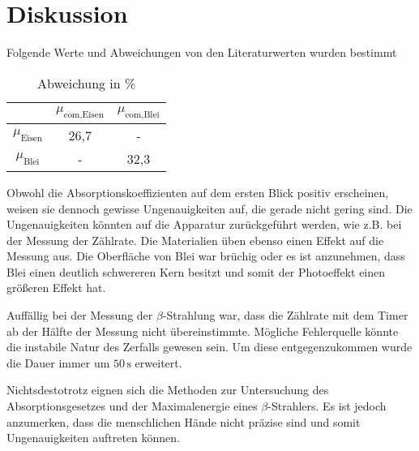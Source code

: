 \section{Diskussion}

\begin{flushleft}
    Folgende Werte und Abweichungen von den Literaturwerten wurden bestimmt
\end{flushleft}

\begin{table}[H]
    \centering
    \caption{Abweichung in \%} 
    \label{Tabelle}
    \begin{tabular} {c c c}
        \toprule
        { } &
        {$ \mu_\text{com,Eisen} $} &
        {$ \mu_\text{com,Blei} $} \\
        \midrule
        $\mu_{\text{Eisen}}$ & 26,7 & - \\
        $\mu_{\text{Blei}}$ & - & 32,3 \\
        \bottomrule
    \end{tabular} 
\end{table}

\begin{flushleft}
    Obwohl die Absorptionskoeffizienten auf dem ersten Blick positiv erscheinen, weisen sie dennoch gewisse Ungenauigkeiten auf, die gerade nicht gering sind.
    Die Ungenauigkeiten könnten auf die Apparatur zurückgeführt werden, wie z.B. bei der Messung der Zählrate. 
    Die Materialien üben ebenso einen Effekt auf die Messung aus. 
    Die Oberfläche von Blei war brüchig oder es ist anzunehmen, dass Blei einen deutlich schwereren Kern besitzt und somit der Photoeffekt einen größeren Effekt hat.
\end{flushleft}

\begin{flushleft}
    Auffällig bei der Messung der $\beta$-Strahlung war, dass die Zählrate mit dem Timer ab der Hälfte der Messung nicht übereinstimmte. 
    Mögliche Fehlerquelle könnte die instabile Natur des Zerfalls gewesen sein. 
    Um diese entgegenzukommen wurde die Dauer immer um $50\,\unit{\second}$ erweitert.
\end{flushleft}

\begin{flushleft}
    Nichtsdestotrotz eignen sich die Methoden zur Untersuchung des Absorptionsgesetzes und der Maximalenergie eines $\beta$-Strahlers.
    Es ist jedoch anzumerken, dass die menschlichen Hände nicht präzise sind und somit Ungenauigkeiten auftreten können.
\end{flushleft}